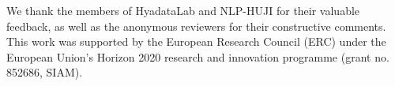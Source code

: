 

We thank the members of HyadataLab and NLP-HUJI for their valuable feedback, as well as the anonymous reviewers for their constructive comments. This work was supported by the European Research Council (ERC) under the European Union’s Horizon 2020 research and innovation programme (grant no. 852686, SIAM).
